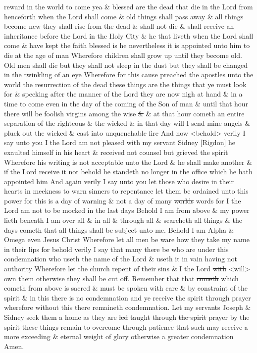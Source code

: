 {reward in the world to come yea \& blessed are the dead that die in the Lord from henceforth when the Lord shall come \& old things shall pass away \& all things become new they shall rise from the dead \& shall not die \& shall receive an inheritance before the Lord in the Holy City \& he that liveth when the Lord shall come \& have kept the faith blessed is he nevertheless it is appointed unto him to die at the age of man Wherefore children shall grow up until they become old. Old men shall die but they shall not sleep in the dust but they shall be changed in the twinkling of an eye Wherefore for this cause preached the apostles unto the world the resurrection of the dead these things are the things that ye must look for \& speeking after the manner of the Lord they are now nigh at hand \& in a time to come even in the day of the coming of the Son of man \& until that hour there will be foolish virgins among the wise \sout{\&} \& at that hour cometh an entire separation of the righteous \& the wicked \& in that day will I send mine angels \& pluck out the wicked \& cast into unquenchable fire And now <behold> verily I say unto you I the Lord am not pleased with my servant Sidney [Rigdon] he exaulted himself in his heart \& received not counsel but grieved the spirit Wherefore his writing is not acceptable unto the Lord \& he shall make another \& if the Lord receive it not behold he standeth no longer in the office which he hath appointed him And again verily I say unto you let those who desire in their hearts in meekness to warn sinners to repentance let them be ordained unto this power for this is a day of warning \& not a day of many \sout{worlds} words for I the Lord am not to be mocked in the last days Behold I am from above \& my power lieth beneath I am over all \& in all \& through all \& searcheth all things \& the days cometh that all things shall be subject unto me. Behold I am Alpha \& Omega even Jesus Christ Wherefore let all men be ware how they take my name in their lips for behold verily I say that many there be who are under this condemnation who useth the name of the Lord \& useth it in vain having not authority Wherefore let the church repent of their sins \& I the Lord \sout{with} <will> own them otherwise they shall be cut off. Remember that that \sout{cometh} which cometh from above is sacred \& must be spoken with care \& by constraint of the spirit \& in this there is no condemnation and ye receive the spirit through prayer wherefore without this there remaineth condemnation. Let my servants Joseph \& Sidney seek them a home as they are \sout{led} taught through \sout{the spirit} prayer by the spirit these things remain to overcome through patience that such may receive a more exceeding \& eternal weight of glory otherwise a greater condemnation Amen.
				
}
